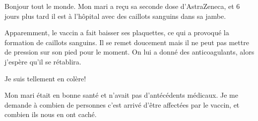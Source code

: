 Bonjour tout le monde. Mon mari a reçu sa seconde dose d'AstraZeneca, et 6 jours
plus tard il est à l'hôpital avec des caillots sanguins dans sa jambe.

Apparemment, le vaccin a fait baisser ses plaquettes, ce qui a provoqué la
formation de caillots sanguins. Il se remet doucement mais il ne peut pas mettre
de pression sur son pied pour le moment. On lui a donné des anticoagulants,
alors j'espère qu'il se rétablira.

Je suis tellement en colère!

Mon mari était en bonne santé et n'avait pas d'antécédents médicaux. Je me
demande à combien de personnes c'est arrivé d'être affectées par le vaccin, et
combien ils nous en ont caché.

